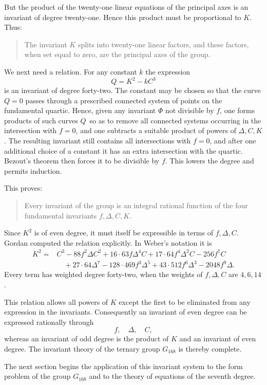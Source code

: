 \documentclass[12pt,a4paper]{article}
\begin{document}
But the product of the twenty-one linear equations of the principal axes is an invariant of degree twenty-one.  Hence this product must be proportional to \(K\).  Thus:
\begin{quote}
The invariant \(K\) splits into twenty-one linear factors, and these factors, when set equal to zero, are the principal axes of the group.
\end{quote}

We next need a relation.  For any constant \(k\) the expression
\[
 Q=K^2-kC^3
\]
is an invariant of degree forty-two.  The constant may be chosen so that the curve \(Q=0\) passes through a prescribed connected system of points on the fundamental quartic.  Hence, given any invariant \(\Phi\) not divisible by \(f\), one forms products of such curves \(Q\,\) so as to remove all connected systems occurring in the intersection with \(f=0\), and one subtracts a suitable product of powers of \(\Delta,C,K\).  The resulting invariant still contains all intersections with \(f=0\), and after one additional choice of a constant it has an extra intersection with the quartic.  Bezout's theorem then forces it to be divisible by \(f\).  This lowers the degree and permits induction.

This proves:
\begin{quote}
Every invariant of the group is an integral rational function of the four fundamental invariants \(f,\Delta,C,K\).
\end{quote}

Since \(K^2\) is of even degree, it must itself be expressible in terms of \(f,\Delta,C\).  Gordan computed the relation explicitly.  In Weber's notation it is
\[
\begin{aligned}
K^2={}&C^3-88 f^2\Delta C^2
   +16\cdot63 f\Delta^4 C
   +17\cdot64 f^4\Delta^2 C
   -256 f^7 C \\
&\quad +27\cdot64\Delta^7
   -128\cdot469 f^3\Delta^5
   +43\cdot512 f^6\Delta^3
   -2048 f^9\Delta .
\end{aligned}
\]
Every term has weighted degree forty-two, when the weights of \(f,\Delta,C\) are \(4,6,14\).

This relation allows all powers of \(K\) except the first to be eliminated from any expression in the invariants.  Consequently an invariant of even degree can be expressed rationally through
\[
 f,
\quad \Delta,
\quad C,
\]
whereas an invariant of odd degree is the product of \(K\) and an invariant of even degree.  The invariant theory of the ternary group \(G_{168}\) is thereby complete.

The next section begins the application of this invariant system to the form problem of the group \(G_{168}\) and to the theory of equations of the seventh degree.
\end{document}
